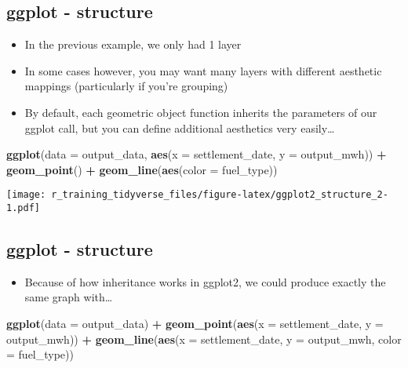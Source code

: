 \documentclass[]{article}
\newenvironment{Shaded}{\begin{snugshade}}{\end{snugshade}}
\newcommand{\KeywordTok}[1]{\textcolor[rgb]{0.13,0.29,0.53}{\textbf{#1}}}
\newcommand{\DataTypeTok}[1]{\textcolor[rgb]{0.13,0.29,0.53}{#1}}
\newcommand{\StringTok}[1]{\textcolor[rgb]{0.31,0.60,0.02}{#1}}
\newcommand{\OperatorTok}[1]{\textcolor[rgb]{0.81,0.36,0.00}{\textbf{#1}}}
\newcommand{\NormalTok}[1]{#1}
\providecommand{\tightlist}{%
  \setlength{\itemsep}{0pt}\setlength{\parskip}{0pt}}
\begin{document}
\subsection{ggplot - structure}\label{ggplot---structure}

\begin{itemize}
\tightlist
\item
  In the previous example, we only had 1 layer
\item
  In some cases however, you may want many layers with different
  aesthetic mappings (particularly if you're grouping)
\item
  By default, each geometric object function inherits the parameters of
  our ggplot call, but you can define additional aesthetics very
  easily\ldots{}
\end{itemize}

\begin{Shaded}
\begin{Highlighting}[]
\KeywordTok{ggplot}\NormalTok{(}\DataTypeTok{data =}\NormalTok{ output_data, }\KeywordTok{aes}\NormalTok{(}\DataTypeTok{x =}\NormalTok{ settlement_date, }\DataTypeTok{y =}\NormalTok{ output_mwh)) }\OperatorTok{+}\StringTok{ }\KeywordTok{geom_point}\NormalTok{() }\OperatorTok{+}\StringTok{ }\KeywordTok{geom_line}\NormalTok{(}\KeywordTok{aes}\NormalTok{(}\DataTypeTok{color =}\NormalTok{ fuel_type))}
\end{Highlighting}
\end{Shaded}

\texttt{[image: r\_training\_tidyverse\_files/figure-latex/ggplot2\_structure\_2-1.pdf]}

\subsection{ggplot - structure}\label{ggplot---structure-1}

\begin{itemize}
\tightlist
\item
  Because of how inheritance works in ggplot2, we could produce exactly
  the same graph with\ldots{}
\end{itemize}

\begin{Shaded}
\begin{Highlighting}[]
\KeywordTok{ggplot}\NormalTok{(}\DataTypeTok{data =}\NormalTok{ output_data) }\OperatorTok{+}\StringTok{ }\KeywordTok{geom_point}\NormalTok{(}\KeywordTok{aes}\NormalTok{(}\DataTypeTok{x =}\NormalTok{ settlement_date, }\DataTypeTok{y =}\NormalTok{ output_mwh)) }\OperatorTok{+}\StringTok{ }\KeywordTok{geom_line}\NormalTok{(}\KeywordTok{aes}\NormalTok{(}\DataTypeTok{x =}\NormalTok{ settlement_date, }\DataTypeTok{y =}\NormalTok{ output_mwh, }\DataTypeTok{color =}\NormalTok{ fuel_type))}
\end{Highlighting}
\end{Shaded}
\end{document}
